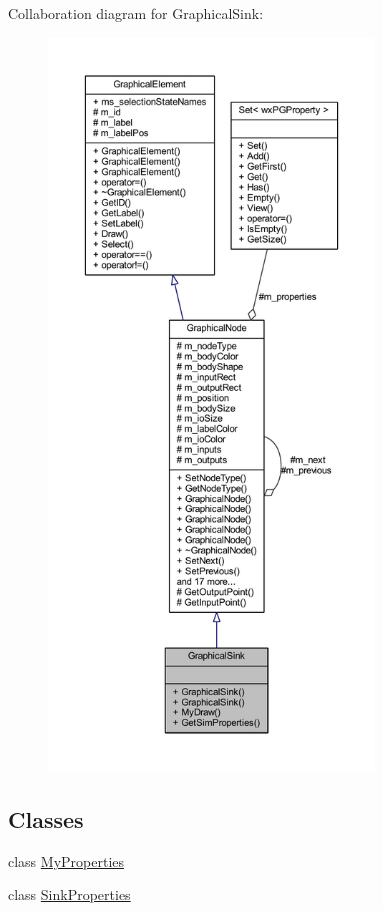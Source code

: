 Collaboration diagram for Graphical\+Sink\+:
\nopagebreak
\begin{figure}[H]
\begin{center}
\leavevmode
\includegraphics[height=550pt]{class_graphical_sink__coll__graph}
\end{center}
\end{figure}
\subsection*{Classes}
\begin{DoxyCompactItemize}
\item 
class \hyperlink{class_graphical_sink_1_1_my_properties}{My\+Properties}
\item 
class \hyperlink{class_graphical_sink_1_1_sink_properties}{Sink\+Properties}
\end{DoxyCompactItemize}
